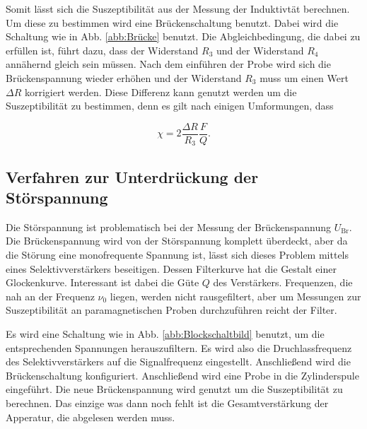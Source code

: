 Somit lässt sich die Suszeptibilität aus der Messung der Induktivtät berechnen. Um diese zu bestimmen wird eine Brückenschaltung benutzt. 
Dabei wird die Schaltung wie in Abb. \ref{abb:Brücke} benutzt. Die Abgleichbedingung, die dabei zu erfüllen ist, führt dazu, dass der Widerstand $R_3$ und der Widerstand $R_4$ annähernd gleich sein müssen. Nach dem einführen der Probe wird sich die Brückenspannung wieder erhöhen und der Widerstand $R_3$ muss um einen Wert $\Delta R$ korrigiert werden. Diese Differenz kann genutzt werden um die Suszeptibilität zu bestimmen, denn es gilt nach einigen Umformungen, dass 

\begin{equation}
    \chi = 2 \frac{\Delta R}{R_3}\frac{F}{Q}.
    \label{eqn:chiexp}
\end{equation}

\subsection{Verfahren zur Unterdrückung der Störspannung}

Die Störspannung ist problematisch bei der Messung der Brückenspannung $U_\text{Br}$. Die Brückenspannung wird von der Störspannung komplett überdeckt, aber da die Störung eine monofrequente Spannung ist, lässt sich dieses Problem mittels eines Selektivverstärkers beseitigen. Dessen Filterkurve hat die Gestalt einer Glockenkurve. Interessant ist dabei die Güte $Q$ des Verstärkers. 
Frequenzen, die nah an der Frequenz $\nu_0$ liegen, werden nicht rausgefiltert, aber um Messungen zur Suszeptibilität an paramagnetischen Proben durchzuführen reicht der Filter. 

Es wird eine Schaltung wie in Abb. \ref{abb:Blockschaltbild} benutzt, um die entsprechenden Spannungen herauszufiltern. 
Es wird also die Druchlassfrequenz des Selektivverstärkers auf die Signalfrequenz eingestellt. Anschließend wird die Brückenschaltung konfiguriert. Anschließend wird eine Probe in die Zylinderspule eingeführt. Die neue Brückenspannung wird genutzt um die Suszeptibilität zu berechnen. Das einzige was dann noch fehlt ist die Gesamtverstärkung der Apperatur, die abgelesen werden muss. 
